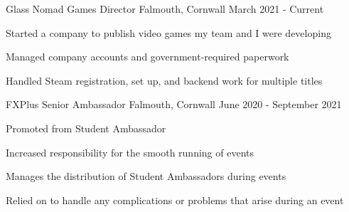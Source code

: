 

\begin{cventries}
    \cventry
        {Glass Nomad Games}
        {Director}
        {Falmouth, Cornwall}
        {March 2021 - Current}
        {
            \begin{cvitems}
                \item Started a company to publish video games my team and I were developing
                \item Managed company accounts and government-required paperwork
                \item Handled Steam registration, set up, and backend work for multiple titles
            \end{cvitems}
        }


    \cventry
        {FXPlus}
        {Senior Ambassador}
        {Falmouth, Cornwall}
        {June 2020 - September 2021}
        {
            \begin{cvitems}
                \item Promoted from Student Ambassador
                \item Increased responsibility for the smooth running of events
                \item Manages the distribution of Student Ambassadors during events
                \item Relied on to handle any complications or problems that arise during an event
            \end{cvitems}
        }


\end{cventries}
